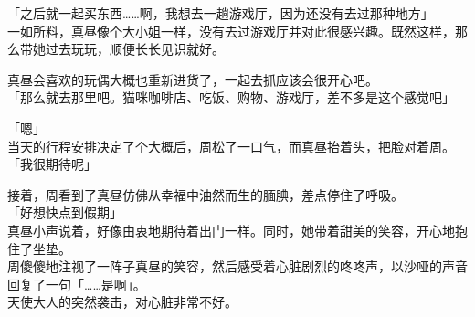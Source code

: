 「之后就一起买东西……啊，我想去一趟游戏厅，因为还没有去过那种地方」\\

一如所料，真昼像个大小姐一样，没有去过游戏厅并对此很感兴趣。既然这样，那么带她过去玩玩，顺便长长见识就好。

真昼会喜欢的玩偶大概也重新进货了，一起去抓应该会很开心吧。\\

「那么就去那里吧。猫咪咖啡店、吃饭、购物、游戏厅，差不多是这个感觉吧」

「嗯」\\

当天的行程安排决定了个大概后，周松了一口气，而真昼抬着头，把脸对着周。\\

「我很期待呢」

接着，周看到了真昼仿佛从幸福中油然而生的腼腆，差点停住了呼吸。\\

「好想快点到假期」\\

真昼小声说着，好像由衷地期待着出门一样。同时，她带着甜美的笑容，开心地抱住了坐垫。\\

周傻傻地注视了一阵子真昼的笑容，然后感受着心脏剧烈的咚咚声，以沙哑的声音回复了一句「……是啊」。\\

天使大人的突然袭击，对心脏非常不好。
